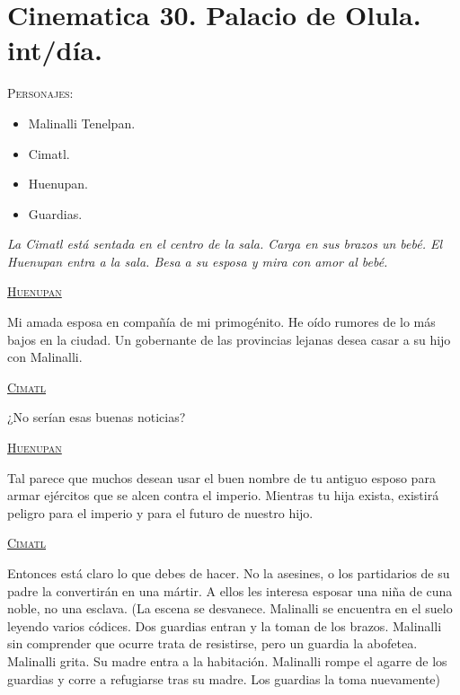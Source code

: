 \section{Cinematica 30. Palacio de Olula. int/día. }  \label{Cin:Cinematica30}
 \textsc{Personajes}:
 \begin{itemize}
 \item Malinalli Tenelpan.
\item Cimatl.
\item Huenupan.
\item Guardias.
 \end{itemize}
\textit{La Cimatl está sentada en el centro de la sala. Carga en sus brazos un bebé. El Huenupan entra a la sala. Besa a su esposa y mira con amor al bebé.}
\begin{center}
\textsc{\underline{Huenupan}}
\\
\par
Mi amada esposa en compañía de mi primogénito. He oído rumores de lo más bajos en la ciudad. Un gobernante de las provincias lejanas desea casar a su hijo con Malinalli.
\\
\par
\textsc{\underline{Cimatl}}
\\
\par
¿No serían esas buenas noticias?
\\
\par
\textsc{\underline{Huenupan}}
\\
\par
Tal parece que muchos desean usar el buen nombre de tu antiguo esposo para armar ejércitos que se alcen contra el imperio. Mientras tu hija exista, existirá peligro para el imperio y para el futuro de nuestro hijo.
\\
\par
\textsc{\underline{Cimatl}}
\\
\par
Entonces está claro lo que debes de hacer. No la asesines, o los partidarios de su padre la convertirán en una mártir. A ellos les interesa esposar una niña de cuna noble, no una esclava. 
(La escena se desvanece. Malinalli se encuentra en el suelo leyendo varios códices. Dos guardias entran y la toman de los brazos. Malinalli sin comprender que ocurre trata de resistirse, pero un guardia la abofetea. Malinalli grita. Su madre entra a la habitación. Malinalli rompe el agarre de los guardias y corre a refugiarse tras su madre. Los guardias la toma nuevamente)
\\
\par

\end{center}
